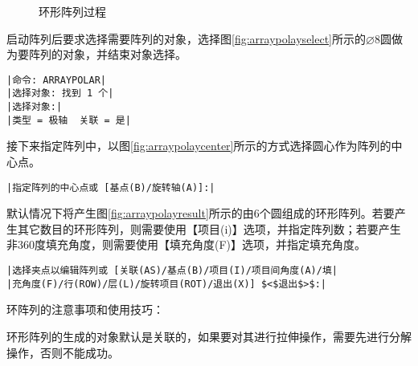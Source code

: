 \begin{procedure}
\begin{figure}[htbp]
\centering
{}\hspace{20pt}
\hspace{20pt}
\caption{环形阵列过程}
\end{figure}

启动阵列后要求选择需要阵列的对象，选择图\ref{fig:arraypolayselect}所示的$\diameter 8$圆做为要阵列的对象，并结束对象选择。
\begin{lstlisting}
|命令: ARRAYPOLAR|
|选择对象: 找到 1 个|
|选择对象:|
|类型 = 极轴  关联 = 是|
\end{lstlisting}
接下来指定阵列中，以图\ref{fig:arraypolaycenter}所示的方式选择圆心作为阵列的中心点。
\begin{lstlisting}
|指定阵列的中心点或 [基点(B)/旋转轴(A)]:|
\end{lstlisting}
默认情况下将产生图\ref{fig:arraypolayresult}所示的由6个圆组成的环形阵列。若要产生其它数目的环形阵列，则需要使用【项目(i)】选项，并指定阵列数；若要产生非360度填充角度，则需要使用【填充角度(F)】选项，并指定填充角度。
\begin{lstlisting}
|选择夹点以编辑阵列或 [关联(AS)/基点(B)/项目(I)/项目间角度(A)/填|
|充角度(F)/行(ROW)/层(L)/旋转项目(ROT)/退出(X)] $<$退出$>$:|
\end{lstlisting}
\end{procedure}
环阵列的注意事项和使用技巧：
\begin{tips}
\item 环形阵列的生成的对象默认是关联的，如果要对其进行拉伸操作，需要先进行分解操作，否则不能成功。
\end{tips}
\endinput